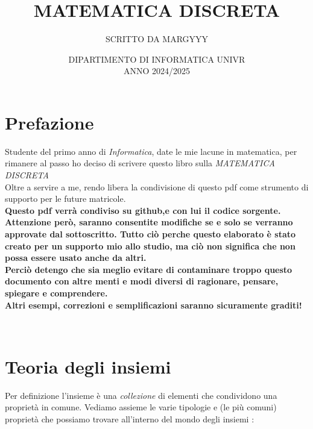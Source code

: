 \documentclass[article,12pt]{book}
\begin{document}
\title{\textbf{MATEMATICA DISCRETA}}  %
\author{SCRITTO DA MARGYYY}  %
\date{DIPARTIMENTO DI INFORMATICA UNIVR \\ ANNO 2024/2025}  %

\maketitle

\tableofcontents

\newpage
\section{Prefazione}
Studente del primo anno di \textit{Informatica}, date le mie lacune in matematica, per rimanere al passo ho deciso di scrivere questo libro sulla \textit{MATEMATICA DISCRETA} \\
Oltre a servire a me, rendo libera la condivisione di questo pdf come strumento di supporto per le future matricole. \\
\textbf{Questo pdf verrà condiviso su github,e con lui il codice sorgente. \\ Attenzione però, saranno consentite modifiche se e solo se verranno approvate dal sottoscritto. Tutto ciò perche questo elaborato è stato creato per un supporto mio allo studio, ma ciò non significa che non possa essere usato anche da altri. \\
Perciò detengo che sia meglio evitare di contaminare troppo questo documento con altre menti e modi diversi di ragionare, pensare, spiegare e comprendere. \\
Altri esempi, correzioni e semplificazioni saranno sicuramente graditi!}

\begin{center} \\[25ex]
    {\scalebox{50}{$\pi$}}  %
\end{center}





\newpage
\section{Teoria degli insiemi}
Per definizione l'insieme è una \textit{collezione} di elementi che condividono una proprietà in comune.
Vediamo assieme le varie tipologie e (le più comuni) proprietà che possiamo trovare all'interno del mondo degli insiemi :
\end{document}
